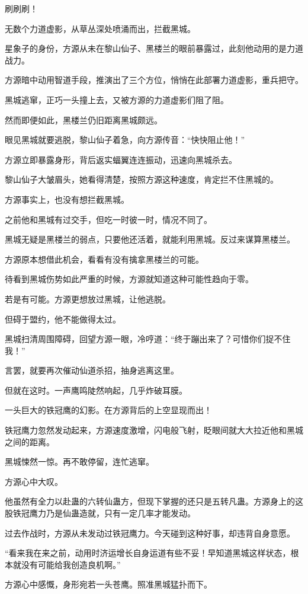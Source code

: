 \begin{this_body}
刷刷刷！

无数个力道虚影，从草丛深处喷涌而出，拦截黑城。

星象子的身份，方源从未在黎山仙子、黑楼兰的眼前暴露过，此刻他动用的是力道战力。

方源暗中动用智道手段，推演出了三个方位，悄悄在此部署力道虚影，重兵把守。

黑城逃窜，正巧一头撞上去，又被方源的力道虚影们阻了阻。

然而即便如此，黑楼兰仍旧距离黑城颇远。

眼见黑城就要逃脱，黎山仙子着急，向方源传音：“快快阻止他！”

方源立即暴露身形，背后返实蝠翼连连振动，迅速向黑城杀去。

黎山仙子大皱眉头，她看得清楚，按照方源这种速度，肯定拦不住黑城的。

方源事实上，也没有想拦截黑城。

之前他和黑城有过交手，但吃一时彼一时，情况不同了。

黑城无疑是黑楼兰的弱点，只要他还活着，就能利用黑城。反过来谋算黑楼兰。

方源原本想借此机会，看看有没有擒拿黑楼兰的可能。

待看到黑城伤势如此严重的时候，方源就知道这种可能性趋向于零。

若是有可能。方源更想放过黑城，让他逃脱。

但碍于盟约，他不能做得太过。

黑城扫清周围障碍，回望方源一眼，冷哼道：“终于蹦出来了？可惜你们捉不住我！”

言罢，就要再次催动仙道杀招，抽身逃离这里。

但就在这时。一声鹰鸣陡然响起，几乎炸破耳膜。

一头巨大的铁冠鹰的幻影。在方源背后的上空显现而出！

铁冠鹰力忽然发动起来，方源速度激增，闪电般飞射，眨眼间就大大拉近他和黑城之间的距离。

黑城悚然一惊。再不敢停留，连忙逃窜。

方源心中大叹。

他虽然有全力以赴蛊的六转仙蛊方，但现下掌握的还只是五转凡蛊。方源身上的这股铁冠鹰力乃是仙蛊造就，只有一定几率才能发动。

过去作战时，方源从未发动过铁冠鹰力。今天碰到这种好事，却违背自身意愿。

“看来我在来之前，动用时济运增长自身运道有些不妥！早知道黑城这样状态，根本就没有可能给我创造良机啊。”

方源心中感慨，身形宛若一头苍鹰。照准黑城猛扑而下。


\end{this_body}
